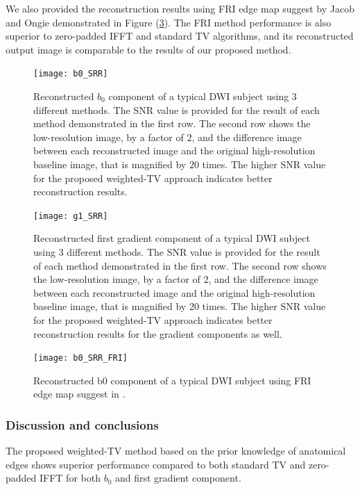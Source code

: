 We also provided the reconstruction results using FRI edge map suggest by Jacob and Ongie \cite{ongie2015} demonstrated in Figure (\ref{b0_SRR_FRI}). The FRI method performance is also superior to zero-padded IFFT and standard TV algorithms, and its reconstructed output image is comparable to the results of our proposed method.

\begin{figure}[ht]
\centering
\texttt{[image: b0\_SRR]}\
\centering
\caption{Reconstructed $b_0$ component of a typical DWI subject using $3$ different methods. The SNR value is provided for the result of each method demonstrated in the first row. The second row shows the low-resolution image, by a factor of $2$, and the difference image between each reconstructed image and the original high-resolution baseline image, that is magnified by $20$ times. The higher SNR value for the proposed weighted-TV approach indicates better reconstruction results.}
\label{b0_SRR}
\end{figure}

\begin{figure}[ht]
\centering
\texttt{[image: g1\_SRR]}\
\centering
\caption{Reconstructed first gradient component of a typical DWI subject using $3$ different methods. The SNR value is provided for the result of each method demonstrated in the first row. The second row shows the low-resolution image, by a factor of $2$, and the difference image between each reconstructed image and the original high-resolution baseline image, that is magnified by $20$ times. The higher SNR value for the proposed weighted-TV approach indicates better reconstruction results for the gradient components as well.}
\label{g1_SRR}
\end{figure}

\begin{figure}[ht]
\centering
\texttt{[image: b0\_SRR\_FRI]}\
\centering
\caption{Reconstructed b0 component of a typical DWI subject using FRI edge map suggest in \cite{ongie2015}.}
\label{b0_SRR_FRI}
\end{figure}


\subsubsection{Discussion and conclusions}
The proposed weighted-TV method based on the prior knowledge of anatomical edges shows superior performance compared to both standard TV and zero-padded IFFT for both $b_0$ and first gradient component.

